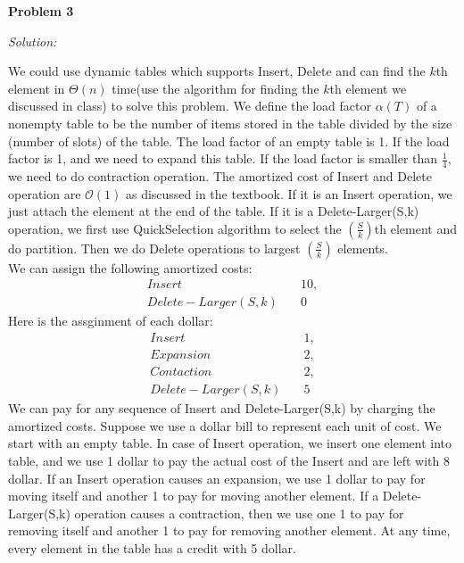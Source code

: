 \documentclass[12pt,letterpaper]{article}
\def\pp{\par\noindent}
\newcommand{\problem}[1]{ \bigskip \pp \textbf{Problem #1}\par}
\newcommand{\solution}{\textit{Solution:}\par}
\begin{document}
\problem{3}
\solution
We could use dynamic tables which supports Insert, Delete and can find the $k$th element in $\Theta(n)$ time(use the algorithm for finding the $k$th element we discussed in class) to solve this problem. We define the load factor $\alpha(T)$ of a nonempty table to be the number of items stored in the table divided by the size (number of slots) of the table. The load factor of an empty table is 1. If the load factor is 1, and we need to expand this table. If the load factor is smaller than $\frac{1}{4}$, we need to do contraction operation. The amortized cost of Insert and Delete operation are $\mathcal{O}(1)$ as discussed in the textbook. If it is an Insert operation, we just attach the element at the end of the table. If it is a Delete-Larger(S,k) operation, we first use QuickSelection algorithm to select the $(\frac{S}{k})$th element and do partition. Then we do Delete operations to largest $(\frac{S}{k})$ elements. \\
We can assign the following amortized costs: 
\begin{align*}
Insert \quad & 10, \\
Delete-Larger(S,k) \quad & 0
\end{align*}
Here is the assginment of each dollar:
\begin{align*}
Insert \quad & 1, \\
Expansion \quad & 2, \\
Contaction \quad & 2, \\
Delete-Larger(S,k) \quad & 5
\end{align*}
We can pay for any sequence of Insert and Delete-Larger(S,k) by charging the amortized costs. Suppose we use a dollar bill to represent each unit of cost. We start with an empty table. In case of Insert operation, we insert one element into table, and we use 1 dollar to pay the actual cost of the Insert and are left with 8 dollar. If an Insert operation causes an expansion, we use 1 dollar to pay for moving itself and another 1 to pay for moving another element. If a Delete-Larger(S,k) operation causes a contraction, then we use one 1 to pay for removing itself and another 1 to pay for removing another element. At any time, every element in the table has a credit with 5 dollar. \\
\end{document}
